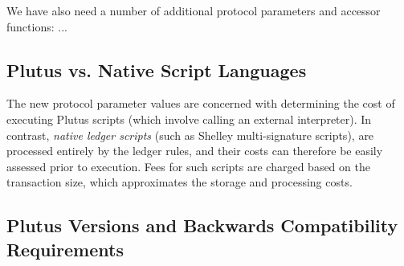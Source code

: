 We have also need a number of additional protocol parameters and accessor functions: ...

\subsection{Plutus vs. Native Script Languages}
\label{sec:plutus-native}

The new protocol parameter values are concerned with determining the cost of executing Plutus scripts (which
involve calling an external interpreter).
%
In contrast, \emph{native ledger scripts} (such as Shelley  multi-signature scripts), are processed entirely by the ledger rules,
and their costs can therefore be easily assessed prior to execution.
Fees for such scripts are charged based on the transaction size,
which approximates the storage and processing costs.

\subsection{Plutus Versions and Backwards Compatibility Requirements}
\label{sec:versions}

